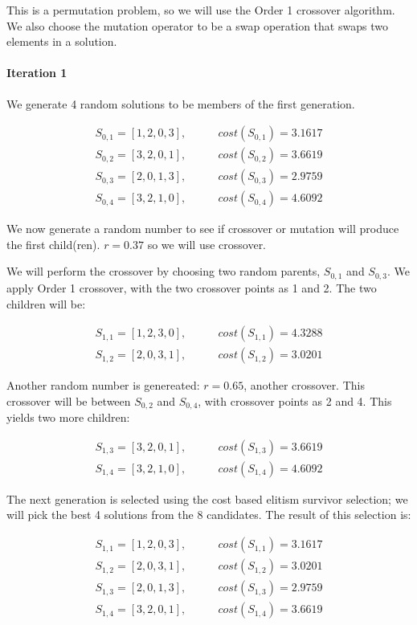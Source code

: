 \documentclass[a4paper]{article}
\newcommand{\subsubsubsection}[1]{\paragraph{#1} \mbox{}}
\begin{document}
This is a permutation problem, so we will use the Order 1 crossover algorithm. We also choose the mutation operator to be a swap operation that swaps two elements in a solution.

\subsubsubsection{Iteration 1}

We generate 4 random solutions to be members of the first generation.

\begin{align*}
S_{0,1} = [1, 2, 0, 3], & \qquad cost(S_{0,1}) = 3.1617 \\
S_{0,2} = [3, 2, 0, 1], & \qquad cost(S_{0,2}) = 3.6619 \\
S_{0,3} = [2, 0, 1, 3], & \qquad cost(S_{0,3}) = 2.9759 \\
S_{0,4} = [3, 2, 1, 0], & \qquad cost(S_{0,4}) = 4.6092
\end{align*}

We now generate a random number to see if crossover or mutation will produce the first child(ren). $r=0.37$ so we will use crossover.

We will perform the crossover by choosing two random parents, $S_{0,1}$ and $S_{0,3}$. We apply Order 1 crossover, with the two crossover points as 1 and 2. The two children will be:

\begin{align*}
S_{1,1} = [1, 2, 3, 0], & \qquad cost(S_{1,1}) = 4.3288 \\
S_{1,2} = [2, 0, 3, 1], & \qquad cost(S_{1,2}) = 3.0201
\end{align*}


Another random number is genereated: $r=0.65$, another crossover. This crossover will be between $S_{0,2}$ and $S_{0,4}$, with crossover points as 2 and 4. This yields two more children:

\begin{align*}
S_{1,3} = [3, 2, 0, 1], & \qquad cost(S_{1,3}) = 3.6619 \\
S_{1,4} = [3, 2, 1, 0], & \qquad cost(S_{1,4}) = 4.6092
\end{align*}


The next generation is selected using the cost based elitism survivor selection; we will pick the best 4 solutions from the 8 candidates. The result of this selection is:

\begin{align*}
S_{1,1} = [1, 2, 0, 3], & \qquad cost(S_{1,1}) = 3.1617 \\
S_{1,2} = [2, 0, 3, 1], & \qquad cost(S_{1,2}) = 3.0201 \\
S_{1,3} = [2, 0, 1, 3], & \qquad cost(S_{1,3}) = 2.9759 \\
S_{1,4} = [3, 2, 0, 1], & \qquad cost(S_{1,4}) = 3.6619
\end{align*}
\end{document}
